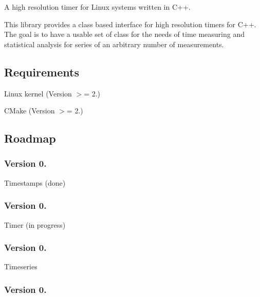 A high resolution timer for Linux systems written in C++.

This library provides a class based interface for high resolution timers for C++. The goal is to have a usable set of class for the needs of time measuring and statistical analysis for series of an arbitrary number of measurements.

\subsection*{Requirements}


\begin{DoxyItemize}
\item Linux kernel (Version $>$= 2.)
\item C\+Make (Version $>$= 2.)
\end{DoxyItemize}

\subsection*{Roadmap}

\subsubsection*{Version 0.}


\begin{DoxyItemize}
\item Timestamps (done)
\end{DoxyItemize}

\subsubsection*{Version 0.}


\begin{DoxyItemize}
\item Timer (in progress)
\end{DoxyItemize}

\subsubsection*{Version 0.}


\begin{DoxyItemize}
\item Timeseries
\end{DoxyItemize}

\subsubsection*{Version 0.}


